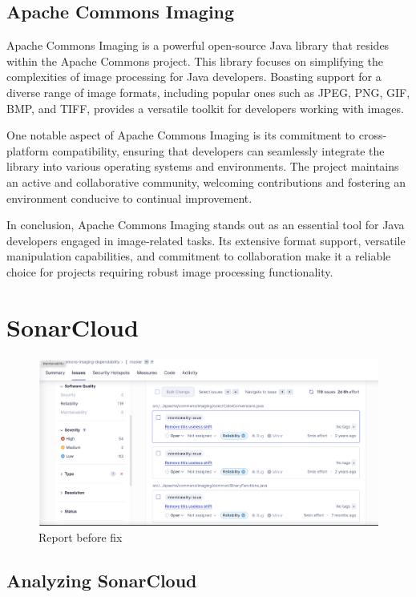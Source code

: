 \documentclass[sigconf]{acmart}
\begin{document}
\subsection{Apache Commons Imaging}
Apache Commons Imaging is a powerful open-source Java library that resides within the Apache Commons project. This library focuses on simplifying the complexities of image processing for Java developers. Boasting support for a diverse range of image formats, including popular ones such as JPEG, PNG, GIF, BMP, and TIFF, provides a versatile toolkit for developers working with images.

One notable aspect of Apache Commons Imaging is its commitment to cross-platform compatibility, ensuring that developers can seamlessly integrate the library into various operating systems and environments. The project maintains an active and collaborative community, welcoming contributions and fostering an environment conducive to continual improvement.

In conclusion, Apache Commons Imaging stands out as an essential tool for Java developers engaged in image-related tasks. Its extensive format support, versatile manipulation capabilities, and commitment to collaboration make it a reliable choice for projects requiring robust image processing functionality.

\section{SonarCloud}

\begin{figure}[h!]
    \centering
    \includegraphics[width=1\linewidth]{reportSonarCloud.png}
    \caption{Report before fix}
    \label{fig:enter-label}
\end{figure}


\subsection{Analyzing SonarCloud}
\end{document}
